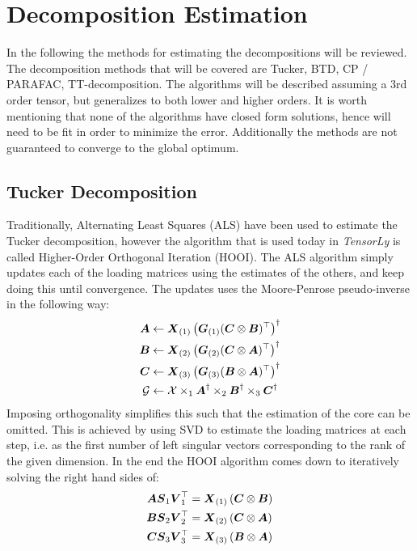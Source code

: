 \section{Decomposition Estimation} \label{app:DecompEstimation}

In the following the methods for estimating the decompositions will be reviewed. The decomposition methods that will be covered are Tucker, BTD, CP / PARAFAC, TT-decomposition. The algorithms will be described assuming a 3rd order tensor, but generalizes to both lower and higher orders. It is worth mentioning that none of the algorithms have closed form solutions, hence will need to be fit in order to minimize the error. Additionally the methods are not guaranteed to converge to the global optimum. 

\subsection{Tucker Decomposition}
Traditionally, Alternating Least Squares (ALS) have been used to estimate the Tucker decomposition\cite[27]{Mørup2011}, however the algorithm that is used today in \textit{TensorLy}\cite{tensorly} is called Higher-Order Orthogonal Iteration (HOOI). The ALS algorithm simply updates each of the loading matrices using the estimates of the others, and keep doing this until convergence. The updates uses the Moore-Penrose pseudo-inverse in the following way:
\begin{align}
\boldsymbol{A} &\leftarrow \boldsymbol{X}_{(1)}\left(\boldsymbol{G}_{(1)}(\boldsymbol{C} \otimes \boldsymbol{B})^{\top}\right)^{\dagger} \\
\boldsymbol{B} &\leftarrow \boldsymbol{X}_{(2)}\left(\boldsymbol{G}_{(2)}(\boldsymbol{C} \otimes \boldsymbol{A})^{\top}\right)^{\dagger} \\
\boldsymbol{C} &\leftarrow \boldsymbol{X}_{(3)}\left(\boldsymbol{G}_{(3)}(\boldsymbol{B} \otimes \boldsymbol{A})^{\top}\right)^{\dagger} \\
\mathcal{G} &\leftarrow \mathcal{X} \times_{1} \boldsymbol{A}^{\dagger} \times_{2} \boldsymbol{B}^{\dagger} \times_{3} \boldsymbol{C}^{\dagger}
\end{align}
Imposing orthogonality simplifies this such that the estimation of the core can be omitted. This is achieved by using SVD to estimate the loading matrices at each step, i.e. as the first number of left singular vectors corresponding to the rank of the given dimension. In the end the HOOI algorithm comes down to iteratively solving the right hand sides of:
\begin{align}
    \boldsymbol{A} \boldsymbol{S}_1\boldsymbol{V}_1^{\top} &= \boldsymbol{X}_{(1)} \left( \boldsymbol{C} \otimes \boldsymbol{B} \right) \\
    \boldsymbol{B} \boldsymbol{S}_2\boldsymbol{V}_2^{\top} &= \boldsymbol{X}_{(2)} \left( \boldsymbol{C} \otimes \boldsymbol{A} \right) \\
    \boldsymbol{C} \boldsymbol{S}_3\boldsymbol{V}_3^{\top} &= \boldsymbol{X}_{(3)} \left( \boldsymbol{B} \otimes \boldsymbol{A} \right)
\end{align}
